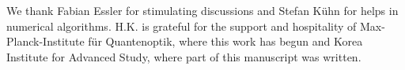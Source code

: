 \documentclass[twocolumn,superscriptaddress, prb]{revtex4-1}
\begin{document}

We thank Fabian Essler for stimulating discussions and Stefan K\"{u}hn for helps in numerical algorithms.
H.K. is grateful for the support and hospitality of Max-Planck-Institute f\"{u}r Quantenoptik,
where this work has begun and Korea Institute for Advanced Study, where part of this manuscript was written.



\end{document}
